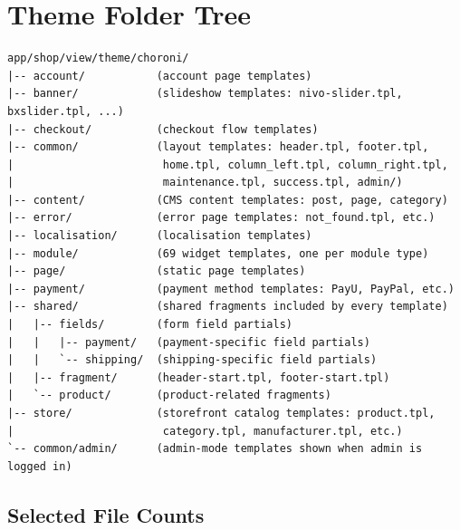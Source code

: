 \documentclass[11pt,a4paper]{article}
\begin{document}
\section{Theme Folder Tree}\label{app:theme-tree}

\begin{verbatim}
app/shop/view/theme/choroni/
|-- account/           (account page templates)
|-- banner/            (slideshow templates: nivo-slider.tpl, bxslider.tpl, ...)
|-- checkout/          (checkout flow templates)
|-- common/            (layout templates: header.tpl, footer.tpl,
|                       home.tpl, column_left.tpl, column_right.tpl,
|                       maintenance.tpl, success.tpl, admin/)
|-- content/           (CMS content templates: post, page, category)
|-- error/             (error page templates: not_found.tpl, etc.)
|-- localisation/      (localisation templates)
|-- module/            (69 widget templates, one per module type)
|-- page/              (static page templates)
|-- payment/           (payment method templates: PayU, PayPal, etc.)
|-- shared/            (shared fragments included by every template)
|   |-- fields/        (form field partials)
|   |   |-- payment/   (payment-specific field partials)
|   |   `-- shipping/  (shipping-specific field partials)
|   |-- fragment/      (header-start.tpl, footer-start.tpl)
|   `-- product/       (product-related fragments)
|-- store/             (storefront catalog templates: product.tpl,
|                       category.tpl, manufacturer.tpl, etc.)
`-- common/admin/      (admin-mode templates shown when admin is logged in)
\end{verbatim}

\subsection{Selected File Counts}
\end{document}
